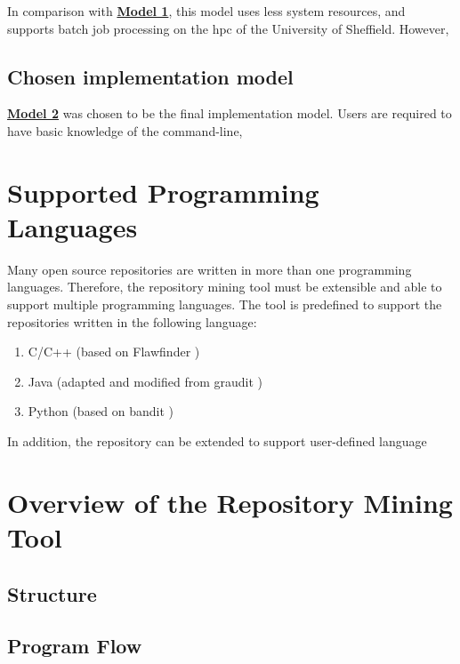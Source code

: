 \documentclass[12pt, a4paper]{report}
\begin{document}
In comparison with \hyperref[subsec:model1]{\textbf{Model 1}}, this model uses less system
resources, and supports batch job processing on the \acrshort{hpc} of the University of Sheffield.
However,

\subsection{Chosen implementation model}
\hyperref[subsec:model2]{\textbf{Model 2}} was chosen to be the final implementation model. Users
are required to have basic knowledge of the command-line,

\section{Supported Programming Languages}
Many open source repositories are written in more than one programming languages. Therefore, the
repository mining tool must be extensible and able to support multiple programming languages. The
tool is predefined to support the repositories written in the following language:
\begin{enumerate}
  \item C/C++ (based on Flawfinder \cite{flawfinder})
  \item Java (adapted and modified from graudit \cite{graudit})
  \item Python (based on bandit \cite{bandit})
\end{enumerate}

In addition, the repository can be extended to support user-defined language

\section{Overview of the Repository Mining Tool}
\subsection{Structure}

\subsection{Program Flow}
\begin{figure}[H]
  \centering
\end{figure}
\end{document}

